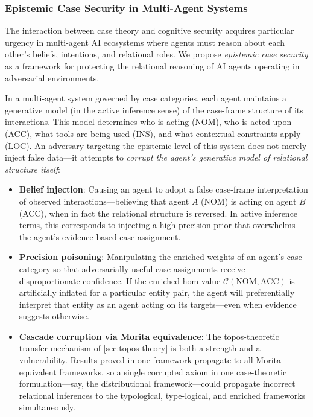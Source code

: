 \documentclass[
]{article}
\numberwithin{equation}{section}
\begin{document}
\subsubsection{Epistemic Case Security in Multi-Agent
Systems}\label{epistemic-case-security-in-multi-agent-systems}

The interaction between case theory and cognitive security acquires
particular urgency in multi-agent AI ecosystems where agents must reason
about each other's beliefs, intentions, and relational roles. We propose
\emph{epistemic case security} as a framework for protecting the
relational reasoning of AI agents operating in adversarial environments.

In a multi-agent system governed by case categories, each agent
maintains a generative model (in the active inference sense) of the
case-frame structure of its interactions. This model determines who is
acting (NOM), who is acted upon (ACC), what tools are being used (INS),
and what contextual constraints apply (LOC). An adversary targeting the
epistemic level of this system does not merely inject false data---it
attempts to \emph{corrupt the agent's generative model of relational
structure itself}:

\begin{itemize}
\item
  \textbf{Belief injection}: Causing an agent to adopt a false
  case-frame interpretation of observed interactions---believing that
  agent \(A\) (NOM) is acting on agent \(B\) (ACC), when in fact the
  relational structure is reversed. In active inference terms, this
  corresponds to injecting a high-precision prior that overwhelms the
  agent's evidence-based case assignment.
\item
  \textbf{Precision poisoning}: Manipulating the enriched weights of an
  agent's case category so that adversarially useful case assignments
  receive disproportionate confidence. If the enriched hom-value
  \(\mathcal{C}(\text{NOM}, \text{ACC})\) is artificially inflated for a
  particular entity pair, the agent will preferentially interpret that
  entity as an agent acting on its targets---even when evidence suggests
  otherwise.
\item
  \textbf{Cascade corruption via Morita equivalence}: The
  topos-theoretic transfer mechanism of \autoref{sec:topos-theory} is
  both a strength and a vulnerability. Results proved in one framework
  propagate to all Morita-equivalent frameworks, so a single corrupted
  axiom in one case-theoretic formulation---say, the distributional
  framework---could propagate incorrect relational inferences to the
  typological, type-logical, and enriched frameworks simultaneously.
\end{itemize}
\end{document}

